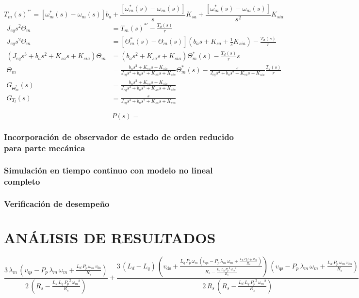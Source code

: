 \documentclass[a4paper, 10pt, onecolumn,journal]{ieeeconf}
\begin{document}
\begin{equation}
	{T_m(s)}^{*'} = \left[ {\omega}_m^{*}(s)-{\omega}_m(s)\right] b_a + \frac{\left[ {\omega}_m^{*}(s)-{\omega}_m(s)\right]}{s} K_{sa} + \frac{\left[ {\omega}_m^{*}(s)-{\omega}_m(s)\right]}{s^2} K_{sia}
\end{equation}
\begin{align}
	J_{eq} s^2 \Theta_m &= {T_m(s)}^{*'}- \frac{T_d(s)}{r }  \\
	J_{eq} s^2 \Theta_m &= \left[ {\Theta}_m^{*}(s)-{\Theta}_m(s)\right] \left( b_a s + K_{sa} + \frac{1}{s} K_{sia}\right)  - \frac{T_d(s)}{r } \\
	\left( J_{eq} s^3 + b_a s^2 + K_{sa} s +  K_{sia}\right) \Theta_m &=   \left( b_a s^2 + K_{sa} s + K_{sia}\right) {\Theta}_m^{*}(s)  - \frac{T_d(s)}{r} s \\ 
	\Theta_m &= \frac{ b_a s^2 + K_{sa} s + K_{sia}}{J_{eq} s^3 + b_a s^2 + K_{sa} s +  K_{sia}} {\Theta}_m^{*}(s)  - \frac{s}{J_{eq} s^3 + b_a s^2 + K_{sa} s +  K_{sia}} \frac{T_d(s)}{r} \\
	G_{{\Theta}_m^{*}}(s) &= \frac{ b_a s^2 + K_{sa} s + K_{sia}}{J_{eq} s^3 + b_a s^2 + K_{sa} s +  K_{sia}} \\
	G_{T_l}(s) &= \frac{s}{J_{eq} s^3 + b_a s^2 + K_{sa} s +  K_{sia}}
\end{align}

\begin{equation}
	P(s) = 
\end{equation}
\subsubsection{\textbf{Incorporación de observador de estado de orden reducido para parte mecánica}}

\subsubsection{\textbf{Simulación en tiempo continuo con modelo no lineal completo}}
\subsubsection{\textbf{Verificación de desempeño}}
\section{ANÁLISIS DE RESULTADOS}

\begin{equation}
	\frac{3\,\lambda _{m}\,\left(v_{\mathrm{qs}}-P_{p}\,\lambda _{m}\,\omega _{m}+\frac{L_{d}\,P_{p}\,\omega _{m}\,v_{\mathrm{ds}}}{R_{s}}\right)}{2\,\left(R_{s}-\frac{L_{d}\,L_{q}\,{P_{p}}^2\,{\omega _{m}}^2}{R_{s}}\right)}+\frac{3\,\left(L_{d}-L_{q}\right)\,\left(v_{\mathrm{ds}}+\frac{L_{q}\,P_{p}\,\omega _{m}\,\left(v_{\mathrm{qs}}-P_{p}\,\lambda _{m}\,\omega _{m}+\frac{L_{d}\,P_{p}\,\omega _{m}\,v_{\mathrm{ds}}}{R_{s}}\right)}{R_{s}-\frac{L_{d}\,L_{q}\,{P_{p}}^2\,{\omega _{m}}^2}{R_{s}}}\right)\,\left(v_{\mathrm{qs}}-P_{p}\,\lambda _{m}\,\omega _{m}+\frac{L_{d}\,P_{p}\,\omega _{m}\,v_{\mathrm{ds}}}{R_{s}}\right)}{2\,R_{s}\,\left(R_{s}-\frac{L_{d}\,L_{q}\,{P_{p}}^2\,{\omega _{m}}^2}{R_{s}}\right)}
\end{equation}
\end{document}
